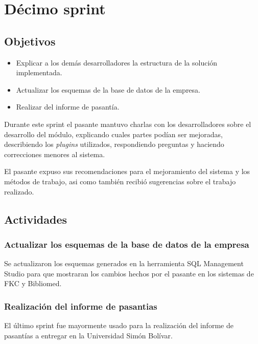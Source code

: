 \section{Décimo sprint} %
\label{sec:decimo_sprint}

\subsection{Objetivos}

\begin{itemize}
	\item Explicar a los demás desarrolladores la estructura de la solución implementada.
	\item Actualizar los esquemas de la base de datos de la empresa.
	\item Realizar del informe de pasantía.
\end{itemize}

Durante este sprint el pasante mantuvo charlas con los desarrolladores sobre el desarrollo del módulo, explicando cuales partes podían ser mejoradas, describiendo los \emph{plugins} utilizados, respondiendo preguntas y haciendo correcciones menores al sistema. 

El pasante expuso sus recomendaciones para el mejoramiento del sistema y los métodos de trabajo, asi como también recibió sugerencias sobre el trabajo realizado.

\subsection{Actividades} %
\label{sub:actividades10}

\subsubsection{Actualizar los esquemas de la base de datos de la empresa}

Se actualizaron los esquemas generados en la herramienta SQL Management Studio para que mostraran los cambios hechos por el pasante en los sistemas de FKC y Bibliomed.

\subsubsection{Realización del informe de pasantias}

El último sprint fue mayormente usado para la realización del informe de pasantías a entregar en la Universidad Simón Bolívar.

